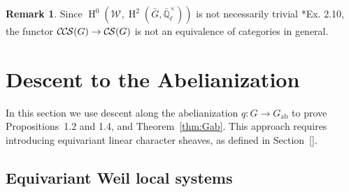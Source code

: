 \documentclass[10pt]{amsart}
\theoremstyle{plain}
\theoremstyle{definition}
\newtheorem{remark}[theorem]{Remark}
\newcommand{\EE}{\mathbb{\bar Q}_\ell}
\newcommand{\EEx}{\EE^\times}
\newcommand{\Weil}[1]{\mathcal{W}_{#1}}
\DeclareMathOperator{\Hh}{H}
\newcommand{\ab}{_{\operatorname{ab}}}
\newcommand{\CS}{{\mathcal{C\hskip-0.8pt S}}}
\newcommand{\CCS}{{\mathcal{C\hskip-.8pt C\hskip-0.8pt S}}}
\newcommand{\bG}{\bar{G}}
\begin{document}
\begin{remark}
Since $\Hh^0(\Weil{},\Hh^2(\bG,\EEx))$ is not necessarily trivial \cite{cunningham-roe:13a}*{Ex. 2.10}, the functor
$\CCS(G) \to \CS(G)$ is not an equivalence of categories in general.
\end{remark}


\section{Descent to the Abelianization} \label{sec:descent}

In this section we use descent along the abelianization $q : G \to G\ab$ to prove Propositions~1.2 and 1.4, and Theorem~\ref{thm:Gab}.
This approach requires introducing equivariant linear character sheaves, as defined in Section~[].

\subsection{Equivariant Weil local systems}
\end{document}
